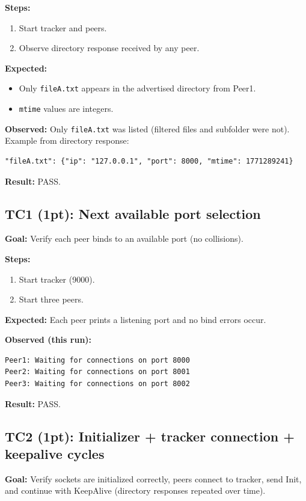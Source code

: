 \documentclass[11pt]{article}
\begin{document}
\textbf{Steps:}
\begin{enumerate}[noitemsep]
  \item Start tracker and peers.
  \item Observe directory response received by any peer.
\end{enumerate}

\textbf{Expected:}
\begin{itemize}[noitemsep]
  \item Only \texttt{fileA.txt} appears in the advertised directory from Peer1.
  \item \texttt{mtime} values are integers.
\end{itemize}

\textbf{Observed:} Only \texttt{fileA.txt} was listed (filtered files and subfolder were not). Example from directory response:
\begin{lstlisting}
"fileA.txt": {"ip": "127.0.0.1", "port": 8000, "mtime": 1771289241}
\end{lstlisting}

\textbf{Result:} PASS.

\subsection{TC1 (1pt): Next available port selection}
\textbf{Goal:} Verify each peer binds to an available port (no collisions).

\textbf{Steps:}
\begin{enumerate}[noitemsep]
  \item Start tracker (9000).
  \item Start three peers.
\end{enumerate}

\textbf{Expected:} Each peer prints a listening port and no bind errors occur.

\textbf{Observed (this run):}
\begin{lstlisting}
Peer1: Waiting for connections on port 8000
Peer2: Waiting for connections on port 8001
Peer3: Waiting for connections on port 8002
\end{lstlisting}

\textbf{Result:} PASS.

\subsection{TC2 (1pt): Initializer + tracker connection + keepalive cycles}
\textbf{Goal:} Verify sockets are initialized correctly, peers connect to tracker, send Init, and continue with KeepAlive (directory responses repeated over time).
\end{document}
